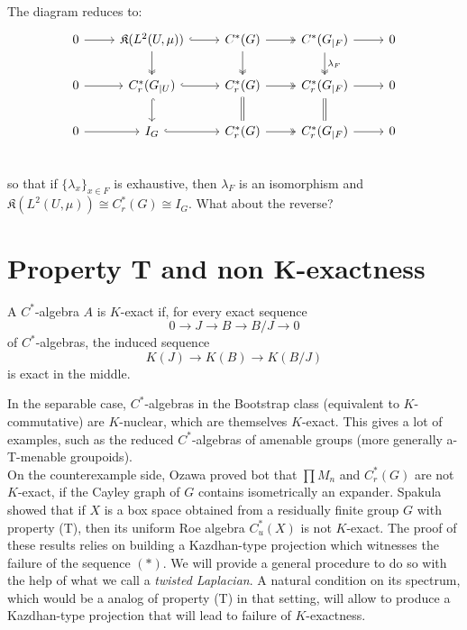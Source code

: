 The diagram reduces to:
\[\begin{tikzcd}
0 \arrow{r} & \mathfrak K(L^2(U,\mu)) \arrow[r,hook] \arrow[d, two heads] & C^*(G)\arrow[r, two heads] \arrow[d, two heads] & C^*(G_{|F})\arrow{r} \arrow[d, two heads, "\lambda_F" ] & 0 \\
0 \arrow{r} &  C_r^*(G_{|U})\arrow[r,hook] \arrow[d,hook] & C_r^*(G)\arrow[r, two heads]  \arrow[d,equal] & C_r^*(G_{|F})\arrow{r} \arrow[d,equal] & 0 \\
0 \arrow{r} &  I_G \arrow[r,hook] & C_r^*(G)\arrow[r, two heads] & C_r^*(G_{|F})\arrow{r} & 0 \\
\end{tikzcd}\]
so that if $\{\lambda_x\}_{x\in F}$ is exhaustive, then $\lambda_F$ is an isomorphism and $\mathfrak K(L^2(U,\mu))\cong C^*_r(G) \cong I_G$. What about the reverse?
\newpage

\section{Property T and non K-exactness}

\begin{definition}
A $C^*$-algebra $A$ is $K$-exact if, for every exact sequence
\[0 \rightarrow J \rightarrow B \rightarrow B/J \rightarrow 0\]
of $C^*$-algebras, the induced sequence
\[ K(J) \rightarrow K(B) \rightarrow K(B/J) \]
is exact in the middle.
\end{definition}

In the separable case, $C^*$-algebras in the Bootstrap class (equivalent to $K$-commutative) are $K$-nuclear, which are themselves $K$-exact. This gives a lot of examples, such as the reduced $C^*$-algebras of amenable groups (more generally a-T-menable groupoids).\\

On the counterexample side, Ozawa proved bot that $\prod M_n$ and $C^*_r (G)$ are not $K$-exact, if the Cayley graph of $G$ contains isometrically an expander. Spakula showed that if $X$ is a box space obtained from a residually finite group $G$ with property (T), then its uniform Roe algebra $C_u^*(X)$ is not $K$-exact. The proof of these results relies on building a Kazdhan-type projection which witnesses the failure of the sequence $(*)$. We will provide a general procedure to do so with the help of what we call a \textit{twisted Laplacian}. A natural condition on its spectrum, which would be a analog of property (T) in that setting, will allow to produce a Kazdhan-type projection that will lead to failure of $K$-exactness.

